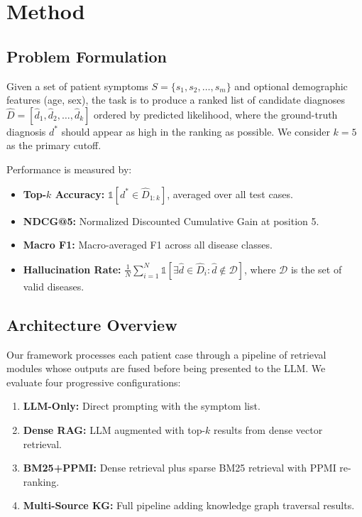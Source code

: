 \documentclass[preprint,12pt]{elsarticle}
\begin{document}
\section{Method}
\label{sec:method}

\subsection{Problem Formulation}

Given a set of patient symptoms $S = \{s_1, s_2, \ldots, s_m\}$ and optional demographic features (age, sex), the task is to produce a ranked list of candidate diagnoses $\hat{D} = [\hat{d}_1, \hat{d}_2, \ldots, \hat{d}_k]$ ordered by predicted likelihood, where the ground-truth diagnosis $d^*$ should appear as high in the ranking as possible. We consider $k{=}5$ as the primary cutoff.

Performance is measured by:
\begin{itemize}
    \item \textbf{Top-$k$ Accuracy:} $\mathbb{1}[d^* \in \hat{D}_{1:k}]$, averaged over all test cases.
    \item \textbf{NDCG@5:} Normalized Discounted Cumulative Gain at position 5.
    \item \textbf{Macro F1:} Macro-averaged F1 across all disease classes.
    \item \textbf{Hallucination Rate:} $\frac{1}{N}\sum_{i=1}^{N} \mathbb{1}[\exists \hat{d} \in \hat{D}_i : \hat{d} \notin \mathcal{D}]$, where $\mathcal{D}$ is the set of valid diseases.
\end{itemize}

\subsection{Architecture Overview}

Our framework processes each patient case through a pipeline of retrieval modules whose outputs are fused before being presented to the LLM. We evaluate four progressive configurations:

\begin{enumerate}
    \item \textbf{LLM-Only:} Direct prompting with the symptom list.
    \item \textbf{Dense RAG:} LLM augmented with top-$k$ results from dense vector retrieval.
    \item \textbf{BM25+PPMI:} Dense retrieval plus sparse BM25 retrieval with PPMI re-ranking.
    \item \textbf{Multi-Source KG:} Full pipeline adding knowledge graph traversal results.
\end{enumerate}
\end{document}
